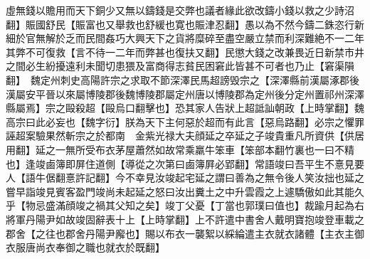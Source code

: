 虛無錢以贍用而天下銅少又無以鑄錢是交弊也議者緣此欲改鑄小錢以救之少詩沼翻】賑國舒民【賑富也又舉救也舒緩也寛也賑津忍翻】愚以為不然今鑄二銖恣行新細於官無解於乏而民間姦巧大興天下之貨將糜碎至盡空嚴立禁而利深難絶不一二年其弊不可復救【言不待一二年而弊甚也復扶又翻】民懲大錢之改兼畏近日新禁市井之間必生紛擾遠利未聞切患猥及富商得志貧民困窘此皆甚不可者也乃止【窘渠隕翻】　魏定州刺史高陽許宗之求取不節深澤民馬超謗毁宗之【深澤縣前漢屬涿郡後漢屬安平晉以來屬博陵郡後魏博陵郡屬定州唐以博陵郡為定州後分定州置祁州深澤縣屬焉】宗之毆殺超【毆烏口翻擊也】恐其家人告狀上超詆訕朝政【上時掌翻】魏高宗曰此必妄也【魏字衍】朕為天下主何惡於超而有此言【惡烏路翻】必宗之懼罪誣超案驗果然斬宗之於都南　金紫光禄大夫顔延之卒延之子竣貴重凡所資供【供居用翻】延之一無所受布衣茅屋蕭然如故常乘羸牛笨車【笨部本翻竹裏也一曰不精也】逢竣鹵簿即屏住道側【導從之次第曰鹵簿屛必郢翻】常語竣曰吾平生不憙見要人【語牛倨翻憙許記翻】今不幸見汝竣起宅延之謂曰善為之無令後人笑汝拙也延之嘗早詣竣見賓客盈門竣尚未起延之怒曰汝出糞土之中升雲霞之上遽驕傲如此其能久乎【物忌盛滿顔竣之禍其父知之矣】竣丁父憂【丁當也郭璞曰值也】裁踰月起為右將軍丹陽尹如故竣固辭表十上【上時掌翻】上不許遣中書舍人戴明寶抱竣登車載之郡舍【之往也郡舍丹陽尹廨也】賜以布衣一襲絮以綵綸遣主衣就衣諸體【主衣主御衣服唐尚衣奉御之職也就衣於既翻】

